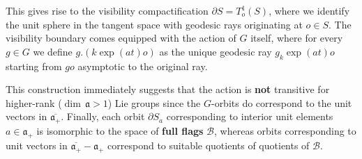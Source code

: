\documentclass[11pt]{amsart}
\theoremstyle{definition}
\begin{document}
		This gives rise to the visibility compactification $\partial S = T^1_o(S)$, where we identify the unit sphere in the tangent space with geodesic rays originating at $o \in S$. The visibility boundary comes equipped with the action of $G$ itself, where for every $g \in G$ we define $g.(k \exp(a t) o)$ as the unique geodesic ray $g_k \exp(a t) o$ starting from $g o$ asymptotic to the original ray.
		
		This construction immediately suggests that the action is \textbf{not} transitive for higher-rank ($\dim \, \mathfrak{a} > 1$) Lie groups since the $G$-orbits do correspond to the unit vectors in $\overline{\mathfrak{a}_+}$. Finally, each orbit $\partial S_a$ corresponding to interior unit elements $a \in \mathfrak{a}_+$ is isomorphic to the space of \textbf{full flags} $\mathcal{B}$, whereas orbits corresponding to unit vectors in $\overline{\mathfrak{a}_+} - \mathfrak{a}_+$ correspond to suitable quotients of quotients of $\mathcal{B}$.  
			
\end{document}
